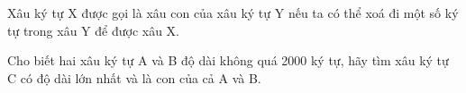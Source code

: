 Xâu ký tự X được gọi là xâu con của xâu ký tự Y nếu ta có thể xoá đi một số ký tự trong xâu Y để được xâu X.

Cho biết hai xâu ký tự A và B độ dài không quá 2000 ký tự, hãy tìm xâu ký tự C có độ dài lớn nhất và là con của cả A và B.